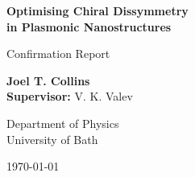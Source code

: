 \begin{center}
    \vspace*{1cm}
    
    \LARGE
    \textbf{Optimising Chiral Dissymmetry\\ in Plasmonic Nanostructures}
    
    \vspace{0.5cm}
    \large
    Confirmation Report
    
    \vspace{1.5cm}
    \normalsize
    \textbf{Joel T. Collins}\\
    \textbf{Supervisor: }V. K. Valev
    
    \vspace{0.8cm}
    Department of Physics\\
    University of Bath
    
    \vspace{0.5cm}
    \today
    
    \vspace{1.5cm}
\end{center}